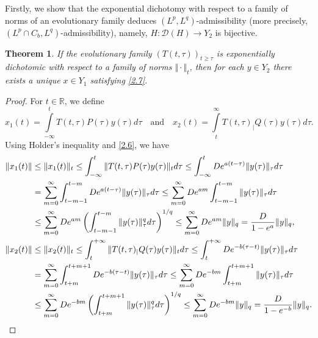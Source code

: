 \documentclass[reqno]{amsart}
\newtheorem{theorem}{Theorem}[section]
\begin{document}
Firstly, we show that the exponential dichotomy with respect to a family of norms of an evolutionary family deduces $(L^p, L^q)$-admissibility (more precisely, $(L^p\cap C_b, L^q)$-admissibility), namely, $H: \mathcal{D}(H) \to Y_2$ is bijective.
\begin{theorem}\label{thm:2.2}
If the evolutionary family $(T(t,\tau))_{t \geq \tau}$ is exponentially dichotomic with respect to a family of norms $\Vert \cdot\Vert _t$, then for each $y \in Y_2$ there exists a unique $x \in Y_1$ satisfying \eqref{2.7}.
\end{theorem}
\begin{proof}
For $t\in \mathbb{R}$, we define
$$ x_1(t)=\displaystyle\int\limits_{-\infty}^{t}T(t,\tau)P(\tau)y(\tau)d\tau \quad \text{and}\quad  x_2(t)=\displaystyle\int\limits_{t}^{\infty}T(t,\tau)_|Q(\tau)y(\tau)d\tau.$$
Using Holder's inequality and \eqref{2.6}, we have
\begin{align*}
\|x_1(t)\| &\le \Vert x_1(t)\Vert _t  \le \displaystyle \int_{-\infty}^{t} \Vert T(t,\tau)P(\tau)y(\tau)\Vert _t d\tau  
\le \displaystyle \int_{-\infty}^{t} D e^{{a}(t-\tau )}\Vert y(\tau)\Vert _{\tau} d\tau \nonumber \\
&= \displaystyle\sum_{m=0}^{\infty} \displaystyle \int_{t-m-1}^{t-m} D e^{{a}(t-\tau )}\Vert y(\tau)\Vert _{\tau} d\tau 
\leq \displaystyle\sum_{m=0}^{\infty}D e^{{a}m} \displaystyle \int_{t-m-1}^{t-m} \Vert y(\tau)\Vert _{\tau} d\tau \nonumber  \\
&\le \displaystyle\sum_{m=0}^{\infty}D e^{{a}m} \left( \displaystyle \int_{t-m-1}^{t-m} \Vert y(\tau)\Vert _{\tau}^q d\tau \right)^{1/q} 
\leq \displaystyle\sum_{m=0}^{\infty}D e^{{a}m} \Vert y\Vert_q 
=\frac{D}{1-e^{a}}\Vert y\Vert _q, \\
\|x_2(t)\| &\le \Vert x_2(t)\Vert _t  \le \displaystyle \int_{t}^{+\infty} \Vert T(t,\tau)_|Q(\tau)y(\tau)\Vert _t d\tau  
\le \displaystyle \int_{t}^{+\infty} D e^{-{b}(\tau -t)}\Vert y(\tau)\Vert _{\tau} d\tau \nonumber \\
&= \displaystyle\sum_{m=0}^{\infty} \displaystyle \int_{t+m}^{t+m+1} D e^{-{b}(\tau -t)}\Vert y(\tau)\Vert _{\tau} d\tau 
\leq \displaystyle\sum_{m=0}^{\infty}D e^{-{b}m} \displaystyle \int_{t+m}^{t+m+1} \Vert y(\tau)\Vert _{\tau} d\tau \nonumber  \\
&\le \displaystyle\sum_{m=0}^{\infty}D e^{-{b}m} \left( \displaystyle \int_{t+m}^{t+m+1} \Vert y(\tau)\Vert _{\tau}^q d\tau \right)^{1/q} 
\leq \displaystyle\sum_{m=0}^{\infty}D e^{-{b}m} \Vert y\Vert_q 
=\frac{D}{1-e^{-{b}}}\Vert y\Vert _q. \notag

\end{align*}
\end{proof}
\end{document}
